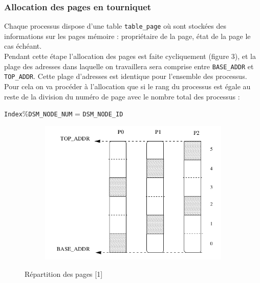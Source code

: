 \subsubsection{Allocation des pages en tourniquet }
\setlength{\parindent}{5ex}
Chaque processus dispose d’une table \texttt{table\_page} où sont stockées des informations sur les pages mémoire :
propriétaire de la page, état de la page le cas échéant.\\
Pendant cette étape l’allocation des pages est faite cycliquement (figure 3), et la plage des adresses dans laquelle on travaillera sera comprise entre \texttt{BASE\_ADDR} et \texttt{TOP\_ADDR}. Cette plage d’adresses est identique pour l’ensemble des processus. Pour cela on va procéder à l'allocation que si le rang du processus est égale au reste de la division du numéro de page avec le nombre total des processus :
\begin{center}
    \texttt{Index}\%\texttt{DSM\_NODE\_NUM} = \texttt{DSM\_NODE\_ID}
\end{center}

\begin{figure}[H]
     \centering
     \begin{subfigure}[H]{0.9\textwidth}
         \centering
         \includegraphics[width=\textwidth]{alloc.png}
     \end{subfigure}
     \caption{Répartition des pages [1]}
\end{figure}

